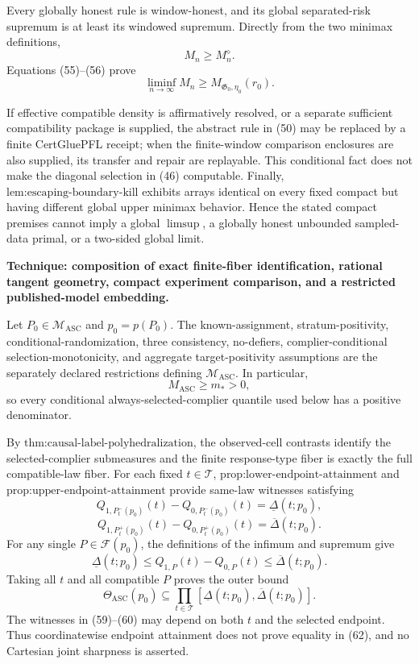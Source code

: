 Every globally honest rule is window-honest, and its global separated-risk supremum is at least its windowed supremum.  Directly from the two minimax definitions,
\[
 M_n\ge M_n^{\diamond}.
 \tag{56}
\]
Equations (55)--(56) prove
\[
 \liminf_{n\to\infty}M_n
 \ge M_{\mathfrak G_0,\eta_0}(r_0).
 \tag{57}
\]

If effective compatible density is affirmatively resolved, or a separate sufficient compatibility package is supplied, the abstract rule in (50) may be replaced by a finite CertGluePFL receipt; when the finite-window comparison enclosures are also supplied, its transfer and repair are replayable.  This conditional fact does not make the diagonal selection in (46) computable.  Finally, \(\text{lem:escaping-boundary-kill}\) exhibits arrays identical on every fixed compact but having different global upper minimax behavior.  Hence the stated compact premises cannot imply a global \(\limsup\), a globally honest unbounded sampled-data primal, or a two-sided global limit.

\textbf{Technique: composition of exact finite-fiber identification, rational tangent geometry, compact experiment comparison, and a restricted published-model embedding.}

Let \(P_0\in\mathcal M_{\mathrm{ASC}}\) and \(p_0=p(P_0)\).  The known-assignment, stratum-positivity, conditional-randomization, three consistency, no-defiers, complier-conditional selection-monotonicity, and aggregate target-positivity assumptions are the separately declared restrictions defining \(\mathcal M_{\mathrm{ASC}}\).  In particular,
\[
 M_{\mathrm{ASC}}\ge m_*>0,
 \tag{58}
\]
so every conditional always-selected-complier quantile used below has a positive denominator.

By \(\text{thm:causal-label-polyhedralization}\), the observed-cell contrasts identify the selected-complier submeasures and the finite response-type fiber is exactly the full compatible-law fiber.  For each fixed \(t\in\mathcal T\), \(\text{prop:lower-endpoint-attainment}\) and \(\text{prop:upper-endpoint-attainment}\) provide same-law witnesses satisfying
\[
 Q_{1,P_t^-(p_0)}(t)-Q_{0,P_t^-(p_0)}(t)
 =\underline\Delta(t;p_0),
 \tag{59}
\]
\[
 Q_{1,P_t^+(p_0)}(t)-Q_{0,P_t^+(p_0)}(t)
 =\overline\Delta(t;p_0).
 \tag{60}
\]
For any single \(P\in\mathcal F(p_0)\), the definitions of the infimum and supremum give
\[
 \underline\Delta(t;p_0)
 \le Q_{1,P}(t)-Q_{0,P}(t)
 \le\overline\Delta(t;p_0).
 \tag{61}
\]
Taking all \(t\) and all compatible \(P\) proves the outer bound
\[
 \Theta_{\mathrm{ASC}}(p_0)
 \subseteq\prod_{t\in\mathcal T}
 [\underline\Delta(t;p_0),\overline\Delta(t;p_0)].
 \tag{62}
\]
The witnesses in (59)--(60) may depend on both \(t\) and the selected endpoint.  Thus coordinatewise endpoint attainment does not prove equality in (62), and no Cartesian joint sharpness is asserted.

